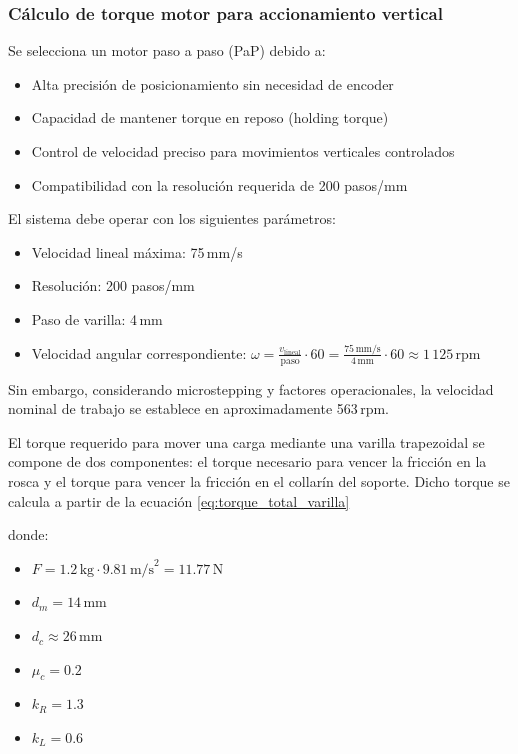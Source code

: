 \subsubsection{Cálculo de torque motor para accionamiento vertical}

Se selecciona un motor paso a paso (PaP) debido a:
\begin{itemize}
    \item Alta precisión de posicionamiento sin necesidad de encoder
    \item Capacidad de mantener torque en reposo (holding torque)
    \item Control de velocidad preciso para movimientos verticales controlados
    \item Compatibilidad con la resolución requerida de 200 pasos/mm
\end{itemize}

El sistema debe operar con los siguientes parámetros:
\begin{itemize}
    \item Velocidad lineal máxima: 75\,mm/s
    \item Resolución: 200 pasos/mm
    \item Paso de varilla: 4\,mm
    \item Velocidad angular correspondiente: $\omega = \frac{v_{\text{lineal}}}{\text{paso}} \cdot 60 = \frac{75\,\text{mm/s}}{4\,\text{mm}} \cdot 60 \approx 1\,125$\,rpm
\end{itemize}

Sin embargo, considerando microstepping y factores operacionales, la velocidad nominal de trabajo se establece en aproximadamente 563\,rpm.

El torque requerido para mover una carga mediante una varilla trapezoidal se compone de dos componentes: el torque necesario para vencer la fricción en la rosca y el torque para vencer la fricción en el collarín del soporte. Dicho torque se calcula a partir de la ecuación \ref{eq:torque_total_varilla}

donde:
\begin{itemize}
    \item $F = 1.2\,\text{kg} \cdot 9.81\,\text{m/s}^2 = 11.77$\,N
    \item $d_m = 14$\,mm 
    \item $d_c \approx 26$\,mm
    \item $\mu_c = 0.2$ 
    \item $k_R = 1.3$ 
    \item $k_L = 0.6$ 
\end{itemize}

